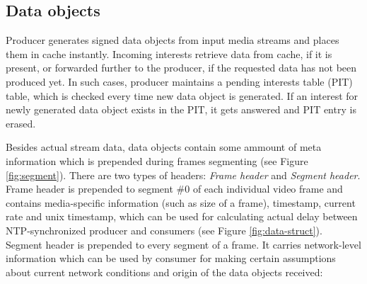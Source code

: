 \documentclass[10pt]{proc}
\begin{document}
\subsection{Data objects}
Producer generates signed data objects from input media streams and places them in cache instantly. Incoming interests retrieve data from cache, if it is present, or forwarded further to the producer, if the requested data has not been produced yet. In such cases, producer maintains a pending interests table (PIT) table, which is checked every time new data object is generated. If an interest for newly generated data object exists in the PIT, it gets answered and PIT entry is erased.

Besides actual stream data, data objects contain some ammount of meta information which is prepended during frames segmenting (see Figure \ref{fig:segment}). There are two types of headers: \textit{Frame header} and \textit{Segment header}. Frame header is prepended to segment \#0 of each individual video frame and contains media-specific information (such as size of a frame), timestamp, current rate and unix timestamp, which can be used for calculating actual delay between NTP-synchronized producer and consumers (see Figure \ref{fig:data-struct}). Segment header is prepended to every segment of a frame. It carries network-level information which can be used by consumer for making certain assumptions about current network conditions and origin of the data objects received:
\end{document}
